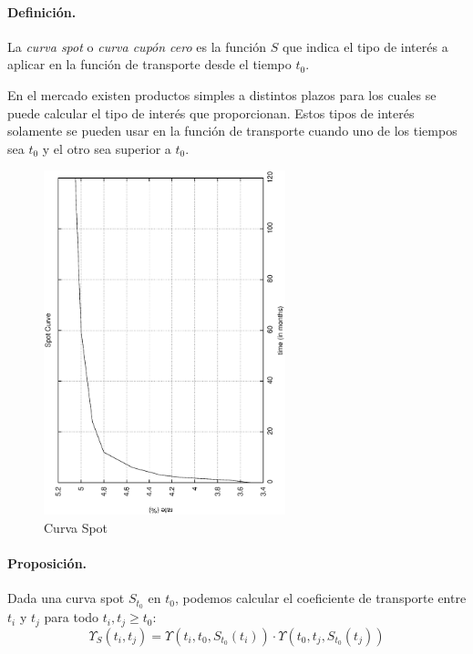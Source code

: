 \paragraph{Definici\'on.} La \emph{curva spot} o
\emph{curva cup\'on cero} es la funci\'on
$S$ que indica el tipo de inter\'es a aplicar en la funci\'on de transporte
desde el tiempo $t_0$.

En el mercado existen productos simples a distintos plazos para los cuales se 
puede calcular el tipo de inter\'es que proporcionan. Estos tipos de inter\'es
solamente se pueden usar en la funci\'on de transporte cuando uno de los
tiempos sea $t_0$ y el otro sea superior a $t_0$.

\begin{figure}[!hb]
\begin{center}
\includegraphics[height=10cm, angle=-90]{./images/spot.ps}
\caption{Curva Spot}
\label{spot}
\end{center}
\end{figure}

\paragraph{Proposici\'on.} Dada una curva spot $S_{t_0}$ en $t_0$, podemos calcular
el coeficiente de transporte entre $t_i$ y $t_j$ para todo $t_i, t_j \ge t_0$:
\begin{equation}
\Upsilon_S(t_i,t_j) =
\Upsilon(t_i,t_0, S_{t_0}(t_i)) \cdot \Upsilon(t_0,t_j, S_{t_0}(t_j))
\end{equation}



